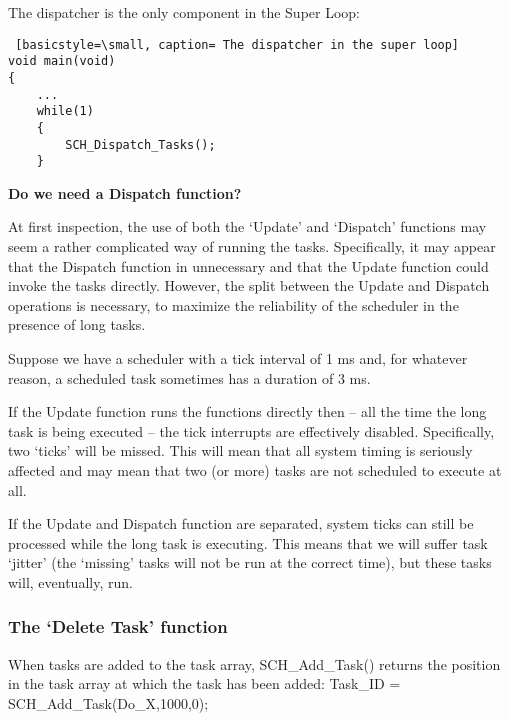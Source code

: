 The dispatcher is the only component in the Super Loop:
\begin{lstlisting} [basicstyle=\small, caption= The dispatcher in the super loop]
void main(void)
{
    ...
    while(1)
    {
        SCH_Dispatch_Tasks();
    }
\end{lstlisting}

\textbf{Do we need a Dispatch function?}

At first inspection, the use of both the ‘Update’ and ‘Dispatch’ functions may seem a
rather complicated way of running the tasks. Specifically, it may appear that the
Dispatch function in unnecessary and that the Update function could invoke the
tasks directly. However, the split between the Update and Dispatch operations is necessary, to maximize the reliability of the scheduler in the presence of long tasks.

Suppose we have a scheduler with a tick interval of 1 ms and, for whatever reason,
a scheduled task sometimes has a duration of 3 ms.

If the Update function runs the functions directly then – all the time the long task
is being executed – the tick interrupts are effectively disabled. Specifically, two ‘ticks’
will be missed. This will mean that all system timing is seriously affected and may
mean that two (or more) tasks are not scheduled to execute at all.

If the Update and Dispatch function are separated, system ticks can still be processed
while the long task is executing. This means that we will suffer task ‘jitter’ (the ‘missing’
tasks will not be run at the correct time), but these tasks will, eventually, run.

\subsubsection{The ‘Delete Task’ function}
When tasks are added to the task array, SCH\_Add\_Task() returns the position in the
task array at which the task has been added:
Task\_ID = SCH\_Add\_Task(Do\_X,1000,0);

